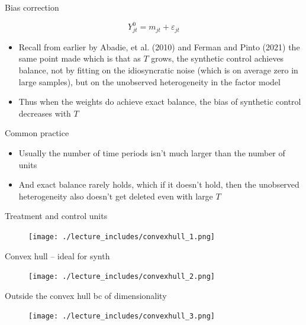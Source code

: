 \documentclass{beamer}
\begin{document}
\begin{frame}{Bias correction}

 $$ Y_{jt}^0 = m_{jt} + \varepsilon_{jt}$$

\begin{itemize}
\item Recall from earlier by Abadie, et al. (2010) and Ferman and Pinto (2021) the same point made which is that as $T$ grows, the synthetic control achieves balance, not by fitting on the idiosyncratic noise (which is on average zero in large samples), but on the unobserved heterogeneity in the factor model
\item Thus when the weights do achieve exact balance, the bias of synthetic control decreases with $T$
\end{itemize}

\end{frame}



\begin{frame}{Common practice}

\begin{itemize}
\item Usually the number of time periods isn't much larger than the number of units
\item And exact balance rarely holds, which if it doesn't hold, then the unobserved heterogeneity also doesn't get deleted even with large $T$
\end{itemize}

\end{frame}


\begin{frame}{Treatment and control units}

	\begin{figure}
	\texttt{[image: ./lecture\_includes/convexhull\_1.png]}
	\end{figure}

\end{frame}

\begin{frame}{Convex hull -- ideal for synth}

	\begin{figure}
	\texttt{[image: ./lecture\_includes/convexhull\_2.png]}
	\end{figure}

\end{frame}

\begin{frame}{Outside the convex hull bc of dimensionality}

	\begin{figure}
	\texttt{[image: ./lecture\_includes/convexhull\_3.png]}
	\end{figure}

\end{frame}
\end{document}
